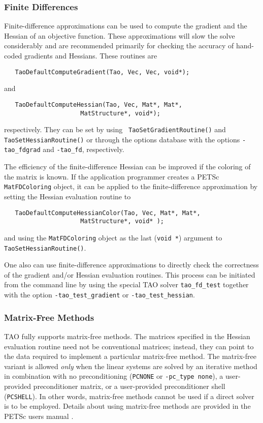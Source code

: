 \subsubsection{Finite Differences} 
Finite-difference approximations can be used to compute the gradient and the
Hessian of an objective
function.  These approximations will slow the solve considerably and 
are recommended primarily  
for checking the accuracy of hand-coded gradients and Hessians.
These routines are
\begin{verbatim}
   TaoDefaultComputeGradient(Tao, Vec, Vec, void*);
\end{verbatim}
and 
\begin{verbatim}
   TaoDefaultComputeHessian(Tao, Vec, Mat*, Mat*, 
                     MatStructure*, void*);
\end{verbatim}
respectively. They can be set by using {\tt
TaoSetGradientRoutine()} and 
{\tt TaoSetHessianRoutine()} or through the options database with the
options {\tt -tao\_fdgrad} and {\tt -tao\_fd}, respectively.

The efficiency of the finite-difference Hessian can be improved if the
coloring of the matrix is known.  If the application programmer creates
a PETSc {\tt MatFDColoring} object, it can be applied to the finite-difference
approximation by setting the Hessian evaluation routine to
\begin{verbatim}
   TaoDefaultComputeHessianColor(Tao, Vec, Mat*, Mat*, 
                     MatStructure*, void* );
\end{verbatim}
and using the {\tt MatFDColoring} object as
the last ({\tt void *}) argument to {\tt TaoSetHessianRoutine()}.

One also can use finite-difference approximations to directly check
the correctness of the gradient and/or Hessian evaluation routines.
This process can be initiated from the command line by using the special 
TAO solver 
{\tt tao\_fd\_test} together with the option
{\tt -tao\_test\_gradient} or {\tt -tao\_test\_hessian}.

\subsubsection{Matrix-Free Methods}
TAO fully supports matrix-free methods. The matrices specified in the
Hessian evaluation routine need not be conventional
matrices; instead, they can point to the data required to implement a
particular matrix-free method.  The matrix-free variant is allowed
{\em only} when the linear systems are solved by an iterative method
in combination with no preconditioning ({\tt PCNONE} or {\tt -pc\_type none}),
a user-provided preconditioner matrix, or a user-provided preconditioner
shell ({\tt PCSHELL}). In other words,
matrix-free methods cannot be used if a direct solver is to 
be employed.  %
Details about using matrix-free methods are provided in the
PETSc users manual \cite{petsc-user-ref}.


